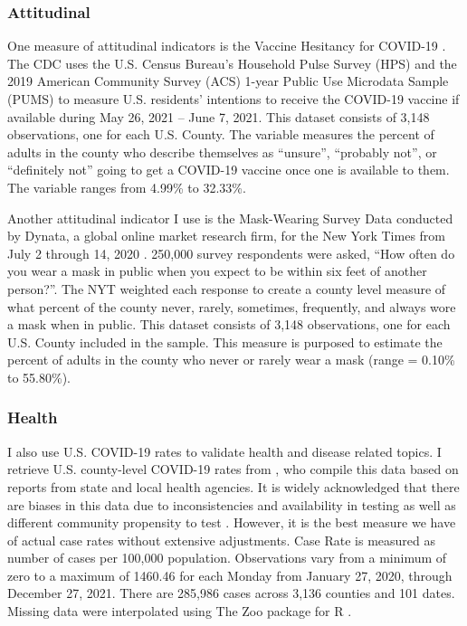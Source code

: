 \subsubsection{Attitudinal}



One measure of attitudinal indicators is the Vaccine Hesitancy for COVID-19
\citep{vaches_data}. The CDC uses the U.S. Census Bureau’s Household Pulse
Survey (HPS) and the 2019 American Community Survey (ACS) 1-year Public Use
Microdata Sample (PUMS) to measure U.S. residents’ intentions to receive the
COVID-19 vaccine if available during May 26, 2021 – June 7, 2021. This dataset
consists of 3,148 observations, one for each U.S. County. The variable measures
the percent of adults in the county who describe themselves as ``unsure'',
``probably not'', or ``definitely not'' going to get a COVID-19 vaccine once one is
available to them. The variable ranges from 4.99\% to 32.33\%.

Another attitudinal indicator I use is the Mask-Wearing Survey Data conducted by
Dynata, a global online market research firm, for the New York Times from July 2
through 14, 2020 \citep{mask_data}. 250,000 survey respondents were asked, ``How
often do you wear a mask in public when you expect to be within six feet of
another person?''. The NYT weighted each response to create a county level
measure of what percent of the county never, rarely, sometimes, frequently, and
always wore a mask when in public. This dataset consists of 3,148 observations,
one for each U.S. County included in the sample. This measure is purposed to
estimate the percent of adults in the county who never or rarely wear a mask
(range = 0.10\% to 55.80\%).

\subsubsection{Health}

I also use U.S. COVID-19 rates to validate health and disease related topics. I
retrieve U.S. county-level COVID-19 rates from \citet{covid_data}, who compile
this data based on reports from state and local health agencies. It is widely
acknowledged that there are biases in this data due to inconsistencies and
availability in testing as well as different community propensity to test \citep{gu22, cdc20a}.
However, it is the best measure we have of
actual case rates without extensive adjustments. Case Rate is measured as number
of cases per 100,000 population. Observations vary from a minimum of zero to a
maximum of 1460.46 for each Monday from January 27, 2020, through December 27,
2021. There are 285,986 cases across 3,136 counties and 101 dates. Missing data
were interpolated using The Zoo package for R \citep{zoo}.

